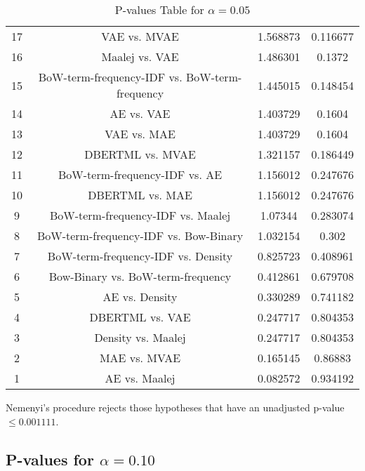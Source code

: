 \documentclass[a4paper,10pt]{article}
\begin{document}
\begin{landscape}
\begin{table}[!htp]
\begin{tabular}{cccc}
17&VAE vs. MVAE&1.568873&0.116677\\
16&Maalej vs. VAE&1.486301&0.1372\\
15&BoW-term-frequency-IDF vs. BoW-term-frequency&1.445015&0.148454\\
14&AE vs. VAE&1.403729&0.1604\\
13&VAE vs. MAE&1.403729&0.1604\\
12&DBERTML vs. MVAE&1.321157&0.186449\\
11&BoW-term-frequency-IDF vs. AE&1.156012&0.247676\\
10&DBERTML vs. MAE&1.156012&0.247676\\
9&BoW-term-frequency-IDF vs. Maalej&1.07344&0.283074\\
8&BoW-term-frequency-IDF vs. Bow-Binary&1.032154&0.302\\
7&BoW-term-frequency-IDF vs. Density&0.825723&0.408961\\
6&Bow-Binary vs. BoW-term-frequency&0.412861&0.679708\\
5&AE vs. Density&0.330289&0.741182\\
4&DBERTML vs. VAE&0.247717&0.804353\\
3&Density vs. Maalej&0.247717&0.804353\\
2&MAE vs. MVAE&0.165145&0.86883\\
1&AE vs. Maalej&0.082572&0.934192\\
\hline
\end{tabular}
\caption{P-values Table for $\alpha=0.05$}
\end{table}Nemenyi's procedure rejects those hypotheses that have an unadjusted p-value $\le0.001111$.

\pagebreak

\subsection{P-values for $\alpha=0.10$}


\end{landscape}
\end{document}
